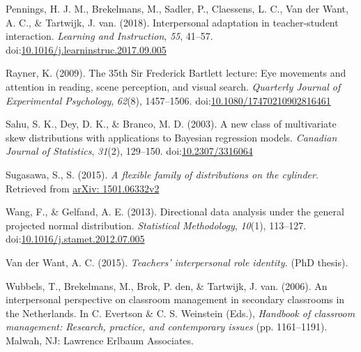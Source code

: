 \documentclass[12pt,]{article}
\DeclareRobustCommand{\VANDER}[3]{#2} %
\begin{document}
\hypertarget{ref-pennings2018interpersonal}{}
Pennings, H. J. M., Brekelmans, M., Sadler, P., Claessens, L. C.,
\VANDER{Want}{Van der}{van der} Want, A. C., \& Tartwijk, J. van.
(2018). Interpersonal adaptation in teacher-student interaction.
\emph{Learning and Instruction}, \emph{55}, 41--57.
doi:\href{https://doi.org/10.1016/j.learninstruc.2017.09.005}{10.1016/j.learninstruc.2017.09.005}

\hypertarget{ref-rayner200935th}{}
Rayner, K. (2009). The 35th Sir Frederick Bartlett lecture: Eye
movements and attention in reading, scene perception, and visual search.
\emph{Quarterly Journal of Experimental Psychology}, \emph{62}(8),
1457--1506.
doi:\href{https://doi.org/10.1080/17470210902816461}{10.1080/17470210902816461}

\hypertarget{ref-sahu2003new}{}
Sahu, S. K., Dey, D. K., \& Branco, M. D. (2003). A new class of
multivariate skew distributions with applications to Bayesian regression
models. \emph{Canadian Journal of Statistics}, \emph{31}(2), 129--150.
doi:\href{https://doi.org/10.2307/3316064}{10.2307/3316064}

\hypertarget{ref-sugasawa2015flexible}{}
Sugasawa, S., S. (2015). \emph{A flexible family of distributions on the
cylinder}. Retrieved from
\href{arXiv:\%201501.06332v2}{arXiv: 1501.06332v2}

\hypertarget{ref-wang2012directional}{}
Wang, F., \& Gelfand, A. E. (2013). Directional data analysis under the
general projected normal distribution. \emph{Statistical Methodology},
\emph{10}(1), 113--127.
doi:\href{https://doi.org/10.1016/j.stamet.2012.07.005}{10.1016/j.stamet.2012.07.005}

\hypertarget{refs}{}
\hypertarget{ref-vanderWant2015role}{}
\VANDER{Want}{Van der}{van der} Want, A. C. (2015). \emph{Teachers'
interpersonal role identity.} (PhD thesis).

\hypertarget{ref-wubbels2006interpersonal}{}
Wubbels, T., Brekelmans, M., Brok, P. den, \& Tartwijk, J. van. (2006).
An interpersonal perspective on classroom management in secondary
classrooms in the Netherlands. In C. Evertson \& C. S. Weinstein (Eds.),
\emph{Handbook of classroom management: Research, practice, and
contemporary issues} (pp. 1161--1191). Malwah, NJ: Lawrence Erlbaum
Associates.
\end{document}

